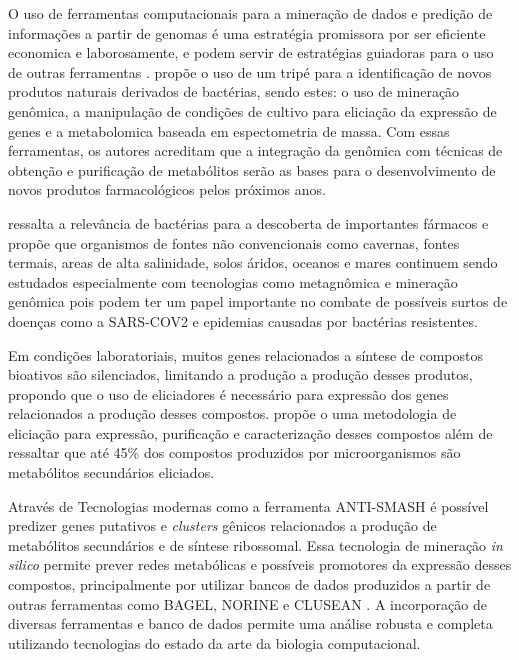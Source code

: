 O uso de ferramentas computacionais para a mineração 
de dados e predição de informações a partir de genomas é uma estratégia promissora por ser
eficiente economica e laborosamente, e podem servir de estratégias guiadoras para o uso de outras 
ferramentas \cite{adamek2017mining}.  propõe o uso de um tripé para a identificação de novos produtos
naturais derivados de bactérias, sendo estes: o uso de mineração genômica, a manipulação de condições
de cultivo para eliciação da expressão de genes e a metabolomica baseada em espectometria de massa. Com
essas ferramentas, os autores acreditam que a integração da genômica com técnicas de obtenção e purificação
de metabólitos serão as bases para o desenvolvimento de novos produtos farmacológicos pelos próximos anos.

 ressalta a relevância de bactérias para a descoberta de importantes
fármacos e propõe que organismos de fontes não convencionais como cavernas, fontes termais,
areas de alta salinidade, solos áridos, oceanos e mares continuem sendo estudados especialmente
com tecnologias como metagnômica e mineração genômica pois podem ter um papel importante no 
combate de possíveis surtos de doenças como a SARS-COV2 e epidemias causadas por bactérias resistentes.


Em condições laboratoriais, muitos genes relacionados a síntese de
compostos bioativos são silenciados, limitando a produção a produção desses produtos, propondo
que o uso de eliciadores é necessário para expressão dos genes relacionados a produção desses 
compostos\cite{rutledge2015}.  propõe o uma metodologia de eliciação para expressão, purificação
e caracterização desses compostos além de ressaltar que até 45\% dos compostos produzidos por
microorganismos são metabólitos secundários eliciados.

Através de Tecnologias modernas como a ferramenta ANTI-SMASH \cite{antismash} é possível predizer
genes putativos e \textit{clusters} gênicos relacionados a produção de metabólitos secundários
e de síntese ribossomal. Essa tecnologia de mineração \textit{in silico} permite prever redes
metabólicas e possíveis promotores da expressão desses compostos, principalmente por utilizar
bancos de dados produzidos a partir de outras ferramentas como BAGEL, NORINE e CLUSEAN \cite{bagel2,bagel3,norine,clusean}.
A incorporação de diversas ferramentas e banco de dados permite uma análise robusta 
e completa utilizando tecnologias do estado da arte da biologia computacional.
